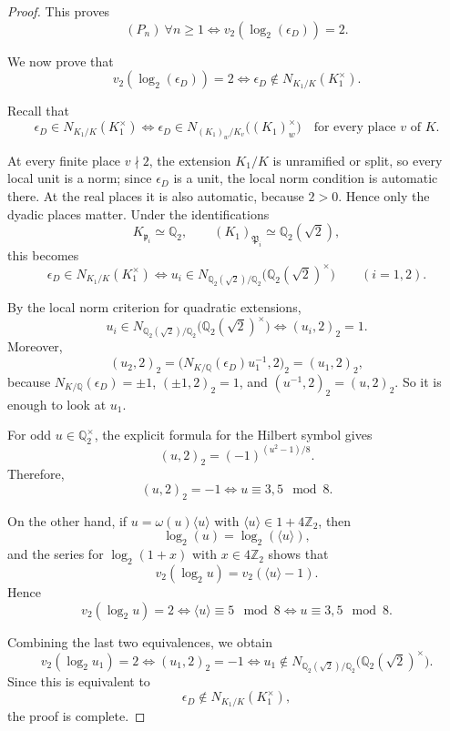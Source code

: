 \documentclass[10pt,a4paper]{amsart}
\newcommand{\Q}{\mathbb{Q}}
\newcommand{\Z}{\mathbb{Z}}
\newcommand{\fk}{\mathfrak }
\begin{document}
\begin{proof}
This proves
$$
(P_n)\ \forall n\ge 1
\iff
v_2(\log_2(\epsilon_D))=2.
$$

We now prove that
$$
v_2(\log_2(\epsilon_D))=2
\iff
\epsilon_D\notin N_{K_1/K}(K_1^\times).
$$

Recall that
$$
\epsilon_D\in N_{K_1/K}(K_1^\times)
\iff
\epsilon_D\in N_{(K_1)_w/K_v}\bigl((K_1)_w^\times\bigr)
\quad\text{for every place }v\text{ of }K.
$$

At every finite place $v\nmid 2$, the extension $K_1/K$ is unramified or split, so every local unit is a norm; since $\epsilon_D$ is a unit, the local norm condition is automatic there. At the real places it is also automatic, because $2>0$. Hence only the dyadic places matter. Under the identifications
$$
K_{\fk p_i}\simeq \Q_2,
\qquad
(K_1)_{\fk P_i}\simeq \Q_2(\sqrt2),
$$
this becomes
$$
\epsilon_D\in N_{K_1/K}(K_1^\times)
\iff
u_i\in N_{\Q_2(\sqrt2)/\Q_2}\bigl(\Q_2(\sqrt2)^\times\bigr)
\qquad (i=1,2).
$$

By the local norm criterion for quadratic extensions,
$$
u_i\in N_{\Q_2(\sqrt2)/\Q_2}\bigl(\Q_2(\sqrt2)^\times\bigr)
\iff
(u_i,2)_2=1.
$$
Moreover,
$$
(u_2,2)_2
=
\bigl(N_{K/\Q}(\epsilon_D)u_1^{-1},2\bigr)_2
=
(u_1,2)_2,
$$
because $N_{K/\Q}(\epsilon_D)=\pm1$, $(\pm1,2)_2=1$, and $(u^{-1},2)_2=(u,2)_2$.
So it is enough to look at $u_1$.

For odd $u\in \Q_2^\times$, the explicit formula for the Hilbert symbol gives
$$
(u,2)_2=(-1)^{(u^2-1)/8}.
$$
Therefore,
$$
(u,2)_2=-1
\iff
u\equiv 3,5 \mod 8.
$$

On the other hand, if $u=\omega(u)\langle u\rangle$ with $\langle u\rangle\in 1+4\Z_2$, then
$$
\log_2(u)=\log_2(\langle u\rangle),
$$
and the series for $\log_2(1+x)$ with $x\in 4\Z_2$ shows that
$$
v_2(\log_2 u)=v_2(\langle u\rangle-1).
$$
Hence
$$
v_2(\log_2 u)=2
\iff
\langle u\rangle\equiv 5 \mod 8
\iff
u\equiv 3,5 \mod 8.
$$

Combining the last two equivalences, we obtain
$$
v_2(\log_2 u_1)=2
\iff
(u_1,2)_2=-1
\iff
u_1\notin N_{\Q_2(\sqrt2)/\Q_2}\bigl(\Q_2(\sqrt2)^\times\bigr).
$$
Since this is equivalent to
$$
\epsilon_D\notin N_{K_1/K}(K_1^\times),
$$
the proof is complete.
\end{proof}
\end{document}
